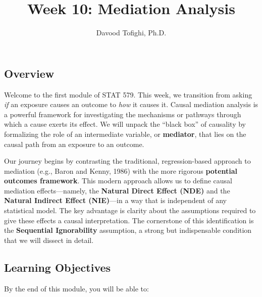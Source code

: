 \documentclass[
  10pt,
  letterpaper,
  DIV=11,
  numbers=noendperiod,
  oneside]{scrartcl}
\title{Week 10: Mediation Analysis}
\author{Davood Tofighi, Ph.D.}
\date{}
\begin{document}
\maketitle


\subsection{Overview}\label{overview}

Welcome to the first module of STAT 579. This week, we transition from
asking \emph{if} an exposure causes an outcome to \emph{how} it causes
it. Causal mediation analysis is a powerful framework for investigating
the mechanisms or pathways through which a cause exerts its effect. We
will unpack the ``black box'' of causality by formalizing the role of an
intermediate variable, or \textbf{mediator}, that lies on the causal
path from an exposure to an outcome.

Our journey begins by contrasting the traditional, regression-based
approach to mediation (e.g., Baron and Kenny, 1986) with the more
rigorous \textbf{potential outcomes framework}. This modern approach
allows us to define causal mediation effects---namely, the
\textbf{Natural Direct Effect (NDE)} and the \textbf{Natural Indirect
Effect (NIE)}---in a way that is independent of any statistical model.
The key advantage is clarity about the assumptions required to give
these effects a causal interpretation. The cornerstone of this
identification is the \textbf{Sequential Ignorability} assumption, a
strong but indispensable condition that we will dissect in detail.

\subsection{Learning Objectives}\label{learning-objectives}

By the end of this module, you will be able to:
\end{document}
